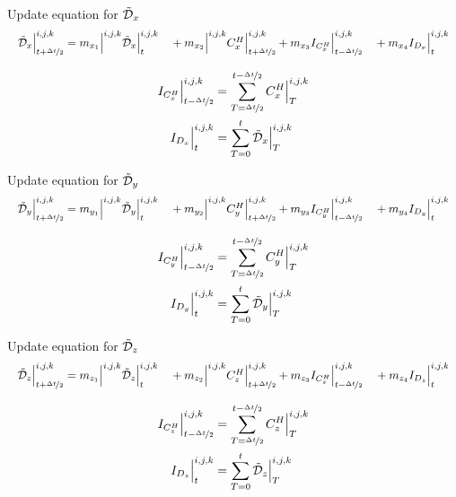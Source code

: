 \documentclass[aspectratio=169]{beamer}
\begin{document}
\begin{frame}{Update equation for $\tilde{\mathcal{D}}_x$}
  \begin{align}
    \resizebox{\hsize}{!}{$
    \Dn_x\Big|_{t+\nicefrac{\dt}{2}}^{i,j,k} = \mxone\Big|^{i,j,k} \Dn_x\Big|_{t}^{i,j,k} 
    \quad + \mxtwo\Big|^{i,j,k}\CHx\Big|^{i,j,k}_{t+\dttwo} + \mxthree \ICHx\Big|^{i,j,k}_{t-\dttwo} 
    \quad + \mxfour \IDx\Big|^{i,j,k}_{t}
    $}
  \end{align}

  \begin{align}
    I_{C^H_x}\Big|^{i,j,k}_{t-\nicefrac{\Delta t}{2}} &= \sum\limits_{T=\nicefrac{\Delta t}{2}}^{t-\nicefrac{\Delta t}{2}}C_x^H\Big|^{i,j,k}_T
    \\
    I_{D_x}\Big|^{i,j,k}_{t} &= \sum\limits_{T=0}^{t} \tilde{\mathcal{D}}_x\Big|^{i,j,k}_T
  \end{align}

\end{frame}

\begin{frame}{Update equation for $\tilde{\mathcal{D}}_y$}
  \begin{align}
    \resizebox{\hsize}{!}{$
    \Dn_y\Big|_{t+\nicefrac{\dt}{2}}^{i,j,k} = \myone\Big|^{i,j,k} \Dn_y\Big|_{t}^{i,j,k} 
    \quad + \mytwo\Big|^{i,j,k}\CHy\Big|^{i,j,k}_{t+\dttwo} + \mythree \ICHy\Big|^{i,j,k}_{t-\dttwo} 
    \quad + \myfour \IDy\Big|^{i,j,k}_{t}
    $}
  \end{align}

  \begin{align}
    I_{C^H_y}\Big|^{i,j,k}_{t-\nicefrac{\Delta t}{2}} &= \sum\limits_{T=\nicefrac{\Delta t}{2}}^{t-\nicefrac{\Delta t}{2}}C_y^H\Big|^{i,j,k}_T
    \\
    I_{D_y}\Big|^{i,j,k}_{t} &= \sum\limits_{T=0}^{t} \tilde{\mathcal{D}}_y\Big|^{i,j,k}_T
  \end{align}

\end{frame}


\begin{frame}{Update equation for $\tilde{\mathcal{D}}_z$}
  \begin{align}
    \resizebox{\hsize}{!}{$
    \Dn_z\Big|_{t+\nicefrac{\dt}{2}}^{i,j,k} = \mzone\Big|^{i,j,k} \Dn_z\Big|_{t}^{i,j,k} 
    \quad + \mztwo\Big|^{i,j,k}\CHz\Big|^{i,j,k}_{t+\dttwo} + \mzthree \ICHz\Big|^{i,j,k}_{t-\dttwo} 
    \quad + \mzfour \IDz\Big|^{i,j,k}_{t}
    $}
  \end{align}

  \begin{align}
    I_{C^H_z}\Big|^{i,j,k}_{t-\nicefrac{\Delta t}{2}} &= \sum\limits_{T=\nicefrac{\Delta t}{2}}^{t-\nicefrac{\Delta t}{2}}C_z^H\Big|^{i,j,k}_T
    \\
    I_{D_z}\Big|^{i,j,k}_{t} &= \sum\limits_{T=0}^{t} \tilde{\mathcal{D}}_z\Big|^{i,j,k}_T
  \end{align}

\end{frame}
\end{document}

